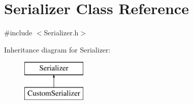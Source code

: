 \hypertarget{classSerializer}{}\section{Serializer Class Reference}
\label{classSerializer}


{\ttfamily \#include $<$Serializer.\+h$>$}

Inheritance diagram for Serializer\+:\begin{figure}[H]
\begin{center}
\leavevmode
\includegraphics[height=2.000000cm]{classSerializer}
\end{center}
\end{figure}

